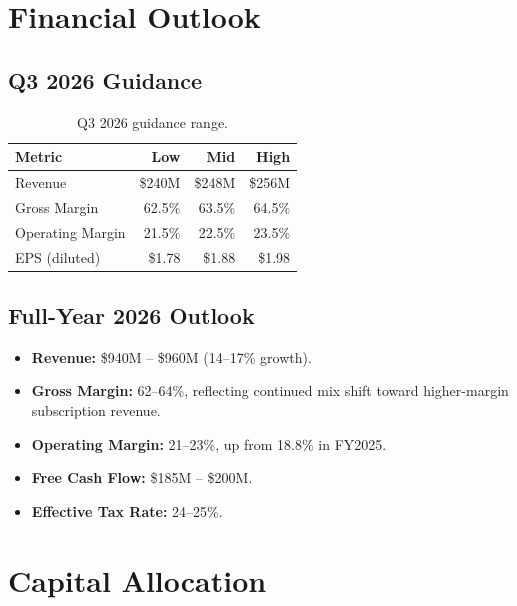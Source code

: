 \documentclass[
    language=english,
    doctype=financial-report,
    institution=none,
]{../../omnilatex}
\begin{document}
\section{Financial Outlook}

\subsection{Q3 2026 Guidance}

\begin{table}[h]
    \centering
    \begin{tabular}{lrrr}
        \toprule
        \textbf{Metric} & \textbf{Low} & \textbf{Mid} & \textbf{High} \\
        \midrule
        Revenue           & \$240M & \$248M & \$256M \\
        Gross Margin      & 62.5\% & 63.5\% & 64.5\% \\
        Operating Margin  & 21.5\% & 22.5\% & 23.5\% \\
        EPS (diluted)     & \$1.78 & \$1.88 & \$1.98 \\
        \bottomrule
    \end{tabular}
    \caption{Q3 2026 guidance range.}
\end{table}

\subsection{Full-Year 2026 Outlook}

\begin{itemize}
    \item \textbf{Revenue:} \$940M -- \$960M (14--17\% growth).
    \item \textbf{Gross Margin:} 62--64\%, reflecting continued mix shift
          toward higher-margin subscription revenue.
    \item \textbf{Operating Margin:} 21--23\%, up from 18.8\% in FY2025.
    \item \textbf{Free Cash Flow:} \$185M -- \$200M.
    \item \textbf{Effective Tax Rate:} 24--25\%.
\end{itemize}

\section{Capital Allocation}
\end{document}
